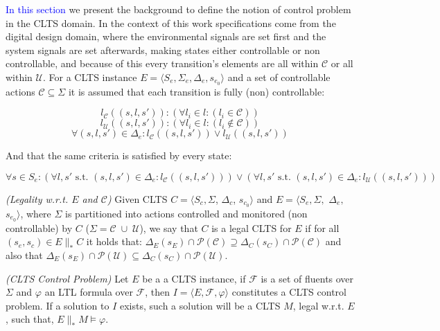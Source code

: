 \textcolor{blue}{In this section} we present the background to define the notion of control problem in the CLTS domain.  In the context of this work specifications come from the digital design domain, where the environmental signals are set first and the system signals are set afterwards, making states either controllable or non controllable, and because of this every transition's elements are all within $\mathcal{C}$ or all within $\mathcal{U}$. For a CLTS instance $E=\langle S_e, \Sigma_e, \Delta_e, s_{e_0} \rangle$ and a set of controllable actions $\mathcal{C} \subseteq \Sigma$ it is assumed that each transition is fully (non) controllable:

\[ l_{\mathcal{C}}((s,l,s')): ( \forall l_i \in l:(l_i \in \mathcal{C}))\]
\[ l_{\mathcal{U}}((s,l,s')): ( \forall l_i \in l:(l_i \not\in \mathcal{C}))\]
\[ \forall (s,l,s') \in \Delta_e: l_{\mathcal{C}}((s,l,s')) \vee l_{\mathcal{U}}((s,l,s')) \]

And that the same criteria is satisfied by every state:

\[ \forall s \in S_e : (\forall l, s' \text{ s.t. } (s,l,s') \in \Delta_e:l_{\mathcal{C}}((s,l,s')))\vee (\forall l, s' \text{ s.t. } (s,l,s') \in \Delta_e:l_{\mathcal{U}}((s,l,s')))\]

\begin{definition}
	\label{def:legal_clts} \emph{(Legality w.r.t. $E$ and $\mathcal{C}$)} 
	Given CLTS $C = \langle S_c, \Sigma$, $\Delta_c$, $s_{c_0}\rangle$ and $E = \langle S_e,\Sigma,$ $\Delta_e,$ $s_{e_0}\rangle$, where $\Sigma$ is partitioned into actions controlled and monitored (non controllable) by $C$ ($\Sigma=\mathcal{C} \; \cup \;\mathcal{U}$), we say that $C$ is a legal CLTS for $E$ if for all $(s_e,s_c) \in E \parallel_* C$ it holds that:
	$\Delta_{E}(s_E)\cap \mathcal{P}(\mathcal{C}) \supseteq \Delta_{C}(s_C)\cap \mathcal{P}(\mathcal{C})$ and also that  $\Delta_{E}(s_E)\cap \mathcal{P}(\mathcal{U}) \subseteq \Delta_{C}(s_C)\cap \mathcal{P}(\mathcal{U})$.
\end{definition}

\begin{definition}
	\label{def:clts_control_problem} \emph{(CLTS Control Problem)} 
	Let $E$ be a a CLTS instance, if $\mathcal{F}$ is a set of fluents over $\Sigma$ and $\varphi$ an LTL formula over $\mathcal{F}$, then $I = \langle E, \mathcal{F}, \varphi \rangle$ constitutes a CLTS control problem. If a solution to $I$ exists, such a solution will be a CLTS $M$, legal w.r.t. $E$, such that, $E \parallel_* M \models \varphi$.
\end{definition}
